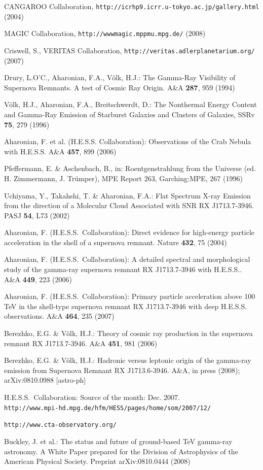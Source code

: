 \documentclass{svjour3x}                     %
\newcommand{\hess}{H.E.S.S.}
\begin{document}
\begin{thebibliography}{}
 CANGAROO Collaboration,
{\tt http://icrhp9.icrr.u-tokyo.ac.jp/gallery.html} (2004)

 MAGIC Collaboration,
{\tt http://wwwmagic.mppmu.mpg.de/} (2008)

 Criswell, S., VERITAS Collaboration,
{\tt http://veritas.adlerplanetarium.org/}
(2007)

 Drury, L.O'C., Aharonian, F.A., V\"olk, H.J.: The Gamma-Ray Visibility of
 Supernova Remnants. A test of Cosmic Ray Origin. A\&A {\bf 287}, 959 (1994)

 V\"olk, H.J., Aharonian, F.A., Breitschwerdt, D.: The Nonthermal Energy
 Content and Gamma-Ray Emission of Starburst Galaxies and Clusters of Galaxies,
 SSRv {\bf 75}, 279 (1996)

Aharonian, F. et al. (H.E.S.S. Collaboration): 
Observations of the Crab Nebula with H.E.S.S.
A\&A {\bf 457}, 899 (2006)

 Pfeffermann, E. \& Aschenbach, B., in: Roentgenstrahlung from the Universe
 (ed. H. Zimmermann, J. Tr\"umper), MPE Report 263, Garching:MPE, 267 (1996)

 Uchiyama, Y., Takahshi, T. \& Aharonian, F.A.: Flat Spectrum X-ray Emission
 from the direction of a Molecular Cloud Associated with SNR RX J1713.7-3946.
 PASJ {\bf 54}, L73 (2002)

 Aharonian, F. (\hess\ Collaboration): Direct evidence for high-energy
 particle acceleration in the shell of a supernova remnant. 
 Nature {\bf 432}, 75 (2004)

 Aharonian, F. (\hess\ Collaboration): A detailed spectral and morphological
 study of the gamma-ray supernova remnant RX J1713.7-3946 with \hess. 
 A\&A {\bf 449}, 223 (2006)

 Aharonian, F. (\hess\ Collaboration): Primary particle acceleration above 100
 TeV in the shell-type supernova remnant RX J1713.7-3946 with deep \hess
 observations. A\&A {\bf 464}, 235 (2007)

 Berezhko, E.G. \& V\"olk, H.J.: Theory of cosmic ray production in the
 supernova remnant RX J1713.7-3946. A\&A {\bf 451}, 981 (2006)

Berezhko, E.G. \& V\"olk, H.J.: Hadronic versus leptonic origin of the
gamma-ray emission from Supernova Remnant RX J1713.6-3946. 
A\&A, in press (2008); arXiv:0810.0988 [astro-ph]

\hess\ Collaboration: Source of the month: Dec. 2007. \\
{\tt http://www.mpi-hd.mpg.de/hfm/HESS/pages/home/som/2007/12/}

 {\tt http://www.cta-observatory.org/}

  Buckley, J. et al.: The status and future of ground-based
  TeV gamma-ray astronomy. A White Paper prepared for the
  Division of Astrophysics of the American Physical Society.
  Preprint arXiv:0810.0444 (2008)


\end{thebibliography}
\end{document}
